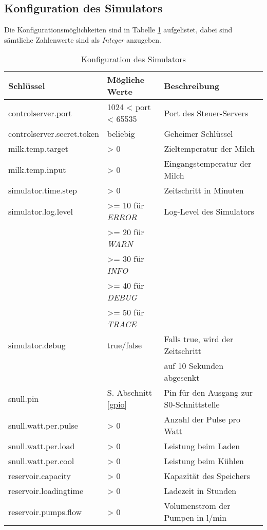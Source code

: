 \subsection{Konfiguration des Simulators}

Die Konfigurationsmöglichkeiten sind in Tabelle \ref{tab:simulatorconfig} aufgelistet, dabei sind sämtliche Zahlenwerte sind als \emph{Integer} anzugeben. %

\begin{table}[H]
\centering
\begin{tabularx}{\textwidth}{|p{}|p{}|X|}
\hline
\textbf{Schlüssel} & \textbf{Mögliche Werte} & \textbf{Beschreibung} \\ \hline
controlserver.port & 1024 < port < 65535 & Port des Steuer-Servers \\ \hline
controlserver.secret.token & beliebig & Geheimer Schlüssel \\ \hline
milk.temp.target & > 0 & Zieltemperatur der Milch \\ \hline
milk.temp.input & > 0 & Eingangstemperatur der Milch \\ \hline
simulator.time.step & > 0 & Zeitschritt in Minuten \\ \hline
simulator.log.level & >= 10 für \emph{ERROR} & Log-Level des Simulators \\
 & >= 20 für \emph{WARN} & \\ 
 & >= 30 für \emph{INFO} & \\
 & >= 40 für \emph{DEBUG} & \\ 
 & >= 50 für \emph{TRACE} & \\ \hline
simulator.debug & true/false & Falls true, wird der Zeitschritt \\
 & & auf 10 Sekunden abgesenkt \\ \hline
snull.pin & S. Abschnitt \ref{gpio} & Pin für den Ausgang zur S0-Schnittstelle \\ \hline
snull.watt.per.pulse & > 0 & Anzahl der Pulse pro Watt \\ \hline
snull.watt.per.load & > 0 & Leistung beim Laden \\ \hline
snull.watt.per.cool & > 0 & Leistung beim Kühlen \\ \hline
reservoir.capacity & > 0 & Kapazität des Speichers \\ \hline
reservoir.loadingtime & > 0 & Ladezeit in Stunden \\ \hline
reservoir.pumps.flow & > 0 & Volumenstrom der Pumpen in l/min \\ \hline
\end{tabularx}
\caption{Konfiguration des Simulators}
\label{tab:simulatorconfig}
\end{table}


